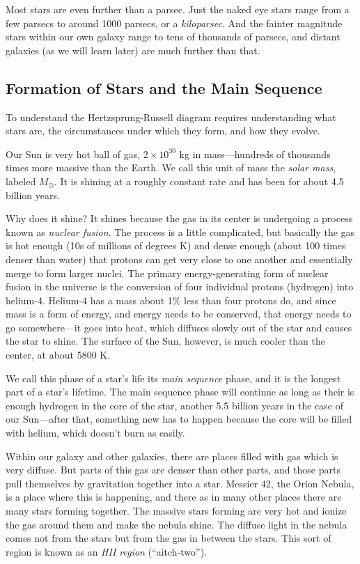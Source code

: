 \documentclass[12pt, preprint]{aastex}
\begin{document}
Most stars are even further than a parsec. Just the naked eye stars
range from a few parsecs to around 1000 parsecs, or a {\it
  kiloparsec}. And the fainter magnitude stars within our own galaxy
range to tens of thousands of parsecs, and distant galaxies (as we
will learn later) are much further than that.

\subsection{Formation of Stars and the Main Sequence}

To understand the Hertzsprung-Russell diagram requires understanding
what stars are, the circumstances under which they form, and how they
evolve. 

Our Sun is very hot ball of gas, $2\times 10^{30}$ kg in
mass---hundreds of thousands times more massive than the Earth. We
call this unit of mass the {\it solar mass}, labeled $M_\odot$. It is
shining at a roughly constant rate and has been for about 4.5 billion
years.

Why does it shine? It shines because the gas in its center is
undergoing a process known as {\it nuclear fusion}. The process is a
little complicated, but basically the gas is hot enough (10s of
millions of degrees K) and dense enough (about 100 times denser than
water) that protons can get very close to one another and essentially
merge to form larger nuclei. The primary energy-generating form of
nuclear fusion in the universe is the conversion of four individual
protons (hydrogen) into helium-4. Helium-4 has a mass about 1\% less
than four protons do, and since mass is a form of energy, and energy
needs to be conserved, that energy needs to go somewhere---it goes
into heat, which diffuses slowly out of the star and causes the star
to shine.  The surface of the Sun, however, is much cooler than the
center, at about 5800 K.

We call this phase of a star's life its {\it main sequence} phase, and
it is the longest part of a star's lifetime. The main sequence phase
will continue as long as their is enough hydrogen in the core of the
star, another 5.5 billion years in the case of our Sun---after that,
something new has to happen because the core will be filled with
helium, which doesn't burn as easily.

Within our galaxy and other galaxies, there are places filled with gas
which is very diffuse. But parts of this gas are denser than other
parts, and those parts pull themselves by gravitation together into a
star. Messier 42, the Orion Nebula, is a place where this is
happening, and there as in many other places there are many stars
forming together. The massive stars forming are very hot and ionize
the gas around them and make the nebula shine. The diffuse light in
the nebula comes not from the stars but from the gas in between the
stars. This sort of region is known as an {\it HII region}
(``aitch-two'').
\end{document}
